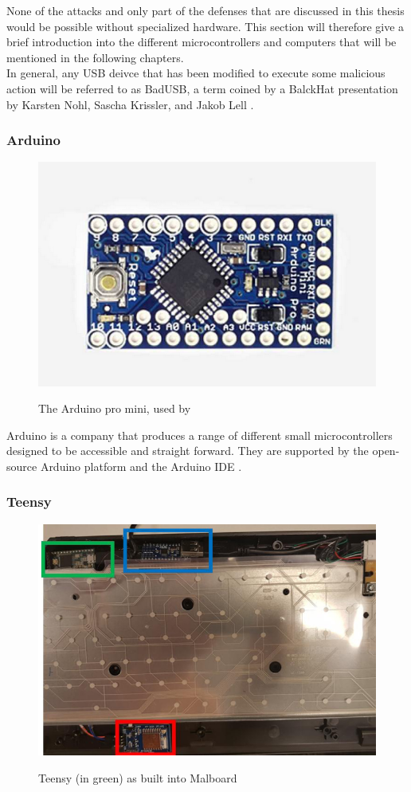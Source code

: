 None of the attacks and only part of the defenses that are discussed in this thesis would be possible without specialized hardware. This section will therefore give a brief introduction into the different microcontrollers and computers that will be mentioned in the following chapters.\\
In general, any USB deivce that has been modified to execute some malicious action will be referred to as BadUSB, a term coined by a BalckHat presentation by Karsten Nohl, Sascha Krissler, and Jakob Lell \cite{Srlabsbadusbblackhatv1Pdf2014}. 


\subsubsection{Arduino}

\begin{figure}[H]
    \centering
    \includegraphics[width=0.25\linewidth]{arduinomini.png}
    \caption{The Arduino pro mini, used by \cite{bojovicRisingThreatHardware2019}}
    \label{fig:ArduinoProMini}
    \cite{ArduinoProMini}
\end{figure}
Arduino \cite{ArduinoHardware} is a company that produces a range of different small microcontrollers designed to be accessible and straight forward. They are supported by the open-source Arduino platform and the Arduino IDE \cite{ArduinoArduino2024}.


\subsubsection{Teensy}

\begin{figure}[H]
    \centering
    \includegraphics[width=0.5\linewidth]{teensy.png}
    \caption{Teensy (in green) as built into Malboard}
    \label{fig:builtInTeensy}
    \cite{farhiMalboardNovelUser2019}
\end{figure}

